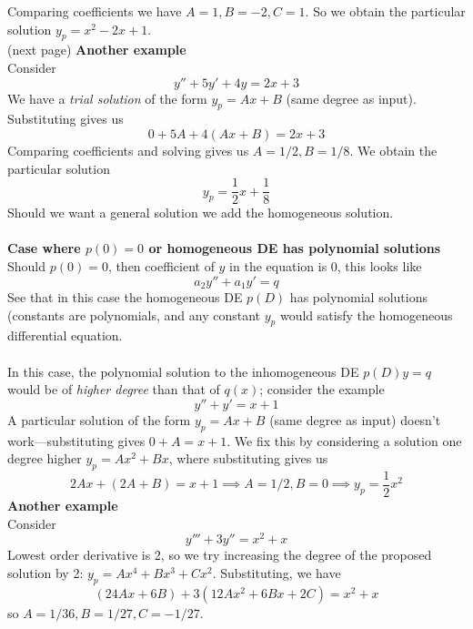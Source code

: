 \documentclass{report}
\begin{document}
Comparing coefficients we have $A=1,B=-2,C=1$. So
we obtain the particular solution $y_p=x^2-2x+1$.\\
(next page)
\newpage
\noindent\textbf{Another example}\\
Consider
\begin{equation*}
y''+5y'+4y=2x+3
\end{equation*}
We have a \textit{trial solution} of the form $y_p=Ax+B$ (same degree as input). Substituting gives us
\begin{equation*}
0+5A+4(Ax+B)=2x+3
\end{equation*}
Comparing coefficients and solving gives us $A=1/2,B=1/8$.
We obtain the particular solution
\begin{equation*}
y_p=\frac{1}{2}x+\frac{1}{8}
\end{equation*}
Should we want a general solution we add the homogeneous solution.\\
\vspace{1mm}\\
\textbf{Case where $p(0)=0$ or homogeneous DE has polynomial solutions}\\
Should $p(0)=0$, then coefficient of $y$ in the equation is 0, this looks like
\begin{equation*}
a_2y''+a_1y'=q
\end{equation*}
See that in this case the homogeneous DE $p(D)$ has polynomial solutions (constants are polynomials, and any
constant $y_p$ would satisfy the homogeneous differential equation.\\
\vspace{1mm}\\
In this case, the polynomial solution to the inhomogeneous DE $p(D)y=q$ would be of \textit{higher degree} than 
that of $q(x)$; consider the example
\begin{equation*}
y''+y'=x+1
\end{equation*}
A particular solution of the form $y_p=Ax+B$ (same degree as input) doesn't work---substituting gives
$0+A=x+1$. We fix this by considering a solution one degree higher $y_p=Ax^2+Bx$, where substituting gives us
\begin{equation*}
2Ax+(2A+B)=x+1\implies A=1/2,B=0\implies y_p=\frac{1}{2}x^2
\end{equation*}
\textbf{Another example}\\
Consider
\begin{equation*}
y'''+3y''=x^2+x
\end{equation*}
Lowest order derivative is 2, so we try increasing the degree of the proposed solution by 2: $y_p=Ax^4+Bx^3+Cx^2$.
Substituting, we have
\begin{equation*}
(24Ax+6B)+3(12Ax^2+6Bx+2C)=x^2+x
\end{equation*}
so $A=1/36,B=1/27,C=-1/27$.
\newpage
\end{document}
